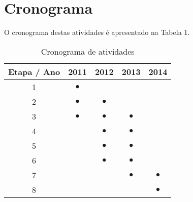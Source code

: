 \documentclass[a4paper,10pt]{article}
\begin{document}
\section{Cronograma}
O cronograma destas atividades é apresentado na Tabela 1.

\pagebreak

\begin{table}
    \begin{center}
	\begin{tabular}{|c|c|c|c|c|}
		\hline Etapa / Ano & 2011 & 2012 & 2013 & 2014 \\ 
		\hline 1 & $\bullet$ 	&  				&  				&  \\ 
		\hline 2 & $\bullet$ 	& $\bullet$			&  				&  \\ 
		\hline 3 & $\bullet$ 	& $\bullet$ 	& $\bullet$ 					&  \\ 
		\hline 4 &  				& $\bullet$ 	& $\bullet$	&  \\ 
		\hline 5 &  				& $\bullet$	&  $\bullet$				&  \\ 
		\hline 6 &  				& $\bullet$	&  $\bullet$				&  \\ 
		\hline 7 &  				&  				& $\bullet$	& $\bullet$ \\ 
		\hline 8 &  				&  				& 					& $\bullet$ \\\hline 
	\end{tabular} 
	\label{crono}
	\caption{Cronograma de atividades}
    \end{center}
\end{table}

\renewcommand{\bibname}{Referências}

 

\end{document}
